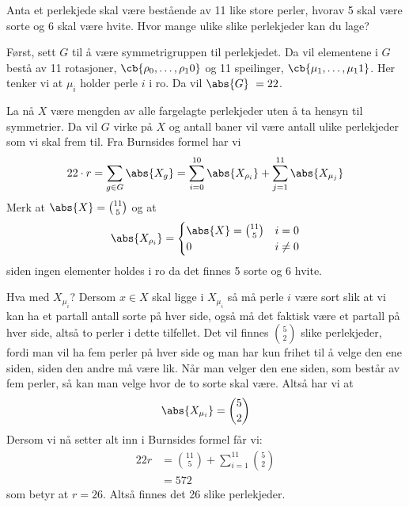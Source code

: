 Anta et perlekjede skal være bestående av 11 like store perler, hvorav 5 skal være sorte og 6 skal
være hvite. Hvor mange ulike slike perlekjeder kan du lage?

Først, sett $G$ til å være symmetrigruppen til perlekjedet. Da vil elementene i $G$ bestå av
11 rotasjoner, $\cb{\rho_0, \dots, \rho_10}$ og 11 speilinger, $\cb{\mu_1, \dots, \mu_11}$. Her
tenker vi at $\mu_i$ holder perle $i$ i ro. Da vil $\abs{G} = 22$. 

La nå $X$ være mengden av alle fargelagte perlekjeder uten å ta hensyn til symmetrier. Da vil $G$
virke på $X$ og antall baner vil være antall ulike perlekjeder som vi skal frem til. Fra Burnsides
formel har vi 
\begin{align}
  22\cdot r = \sum_{g\in G} \abs{X_g} = \sum_{i=0}^{10} \abs{X_{\rho_i}} + 
  \sum_{j=1}^{11}\abs{X_{\mu_j}}
\end{align}
Merk at $\abs{X} = \binom{11}{5}$ og at
\begin{align}
  \abs{X_{\rho_i}} = \begin{cases}
      \abs{X} = \binom{11}{5} & i = 0 \\
      0 & i \neq 0
  \end{cases}
\end{align}
siden ingen elementer holdes i ro da det finnes 5 sorte og 6 hvite. 

Hva med $X_{\mu_i}$? Dersom $x\in X$ skal ligge i $X_{\mu_i}$ så må perle $i$ være sort slik at vi
kan ha et partall antall sorte på hver side, også må det faktisk være et partall på hver side,
altså to perler i dette tilfellet. Det vil finnes $\binom{5}{2}$ slike perlekjeder, fordi man
vil ha fem perler på hver side og man har kun frihet til å velge den ene siden, siden den andre
må være lik. Når man velger den ene siden, som består av fem perler, så kan man velge hvor de to
sorte skal være. Altså har vi at
\begin{align}
  \abs{X_{\mu_i}} = \binom{5}{2}
\end{align}
Dersom vi nå setter alt inn i Burnsides formel får vi:
\begin{align}
  22r &= \binom{11}{5} + \sum_{i=1}^{11} \binom{5}{2} \\
      &= 572
\end{align}
som betyr at $r = 26$. Altså finnes det 26 slike perlekjeder. 

